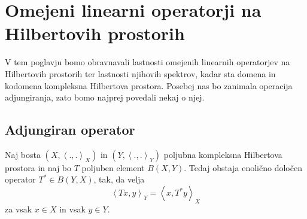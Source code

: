 \documentclass[12pt,a4paper,oneside,fleqn,openany]{book}
\newcommand{\Sp}[2]{\ensuremath{\left<#1, #2\right>}}
\begin{document}
\chapter{Omejeni linearni operatorji na Hilbertovih prostorih}
V tem poglavju bomo obravnavali lastnosti omejenih linearnih operatorjev na Hilbertovih prostorih ter lastnosti njihovih spektrov, kadar sta domena in kodomena kompleksna Hilbertova prostora. Posebej nas bo zanimala operacija adjungiranja, zato bomo najprej povedali nekaj o njej.
\section[Adjungiran operator]{Adjungiran operator}

\begin{izrek}
	\label{izr:Adjexist}
	Naj bosta $(X, \Sp{.}{.}_X)$ in $(Y, \Sp{.}{.}_Y)$ poljubna kompleksna Hilbertova prostora in naj bo $T$ poljuben element $B(X, Y)$. Tedaj obstaja enolično določen operator $T^*\in B(Y, X)$, tak, da velja $$\Sp{Tx}{y}_Y = \Sp{x}{T^*y}_X$$ za vsak $x\in X$ in vsak $y \in Y$.
\end{izrek}
\end{document}
